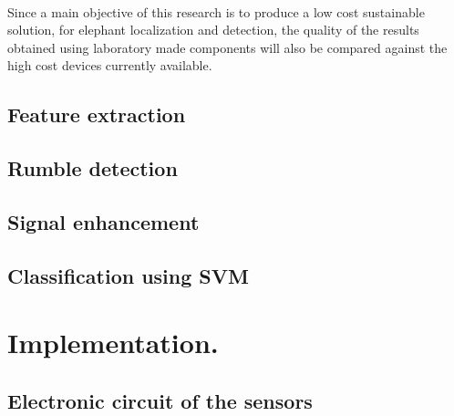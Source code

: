 \documentclass[12pt]{article}
\numberwithin{figure}{section}
\numberwithin{table}{section}
\begin{document}
\paragraph{}
Since a main objective of this research is to produce a low cost sustainable solution, for elephant localization and detection, the quality of the results obtained using laboratory made components will also be compared against the high cost devices currently available.

\subsection{Feature extraction}
\subsection{Rumble detection}
\subsection{Signal enhancement}
\subsection{Classification using SVM}


\newpage
\section{Implementation.}
\subsection{Electronic circuit of the sensors}






\newpage
\end{document}

